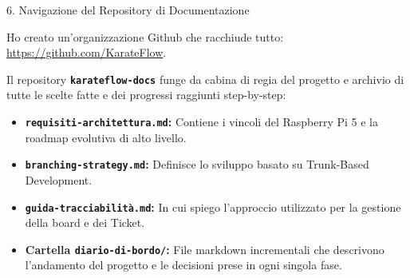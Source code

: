 \documentclass[aspectratio=169, 10pt]{beamer}
\begin{document}
\begin{frame}{6. Navigazione del Repository di Documentazione}
    
    Ho creato un'organizzazione Github che racchiude tutto: \url{https://github.com/KarateFlow}.

  \vspace{0.2cm}
  Il repository \textbf{\texttt{karateflow-docs}} funge da cabina di regia del progetto e archivio di tutte le scelte fatte e dei progressi raggiunti step-by-step:
  \vspace{0.4cm}

      \begin{itemize}
        \item \textbf{\texttt{requisiti-architettura.md}:} Contiene i vincoli del Raspberry Pi 5 e la roadmap evolutiva di alto livello.
        \item \textbf{\texttt{branching-strategy.md}:} Definisce lo sviluppo basato su Trunk-Based Development.
        \item \textbf{\texttt{guida-tracciabilità.md}:} In cui spiego l'approccio utilizzato per la gestione della board e dei Ticket.
        \item \textbf{Cartella \texttt{diario-di-bordo/}:} File markdown incrementali che descrivono l'andamento del progetto e le decisioni prese in ogni singola fase.
      \end{itemize}

\end{frame}
\end{document}
